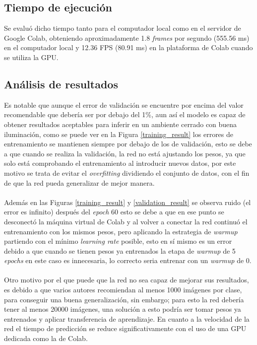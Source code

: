 \subsection{Tiempo de ejecución}
Se evaluó dicho tiempo tanto para el computador local como en el servidor de Google Colab, obteniendo aproximadamente 1.8 \textit{frames} por segundo (555.56 ms) en el computador local y 12.36 FPS (80.91 ms) en la plataforma de Colab cuando se utiliza la GPU.
\subsection{Análisis de resultados}
Es notable que aunque el error de validación se encuentre por encima del valor recomendable que debería ser por debajo del 1\%, aun así el modelo es capaz de obtener resultados aceptables para inferir en un ambiente cerrado con buena iluminación, como se puede ver en la Figura \ref{training_result} los errores de entrenamiento se mantienen siempre por debajo de los de validación, esto se debe a que cuando se realiza la validación, la red no está ajustando los pesos, ya que solo está comprobando el entrenamiento al introducir nuevos datos, por este motivo se trata de evitar el \textit{overfitting} dividiendo el conjunto de datos, con el fin de que la red pueda generalizar de mejor manera.
\\
\\
Además en las Figuras \ref{training_result} y \ref{validation_result} se observa ruido (el error es infinito) después del \textit{epoch} 60 esto se debe a que en ese punto se desconectó la máquina virtual de Colab y al volver a conectar la red continuó el entrenamiento con los mismos pesos, pero aplicando la estrategia de \textit{warmup} partiendo con el mínimo \textit{learning rate} posible, esto en sí mismo es un error debido a que cuando se tienen pesos ya entrenados la etapa de \textit{warmup} de 5 \textit{epochs} en este caso es innecesaria, lo correcto seria entrenar con un \textit{warmup} de 0.
\\
\\
Otro motivo por el que puede que la red no sea capaz de mejorar sus resultados, es debido a que varios autores recomiendan al menos 1000 imágenes por clase, para conseguir una buena generalización, sin embargo; para esto la red debería tener al menos 20000 imágenes, una solución a esto podría ser tomar pesos ya entrenados y aplicar transferencia de aprendizaje. En cuanto a la velocidad de la red el tiempo de predicción se reduce significativamente con el uso de una GPU dedicada como la de Colab.
